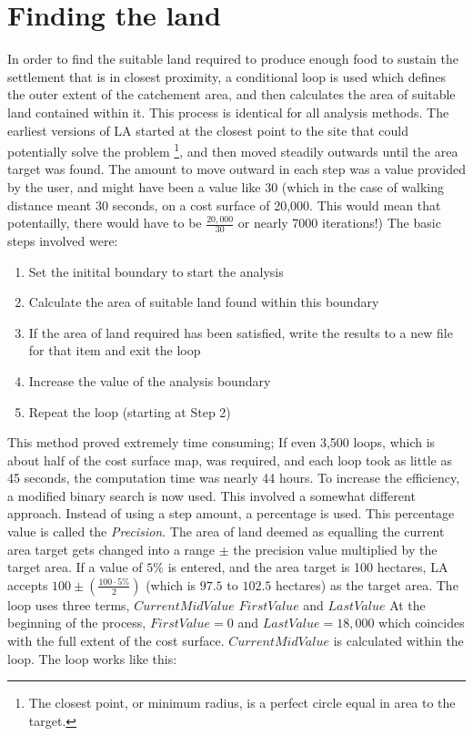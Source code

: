 \section{Finding the land} 

In order to find the suitable land required
to produce enough food to sustain the settlement that is in closest proximity, 
a conditional loop is used which defines the outer extent of the catchement area, 
and then calculates the area of suitable land contained within it.  This process is identical for all
analysis methods.  The earliest versions of LA started at the
closest point to the site that could potentially solve the problem
\footnote{The closest point, or minimum radius, is a perfect circle equal in
area to the target.}, and then moved steadily outwards until the area target
was found.  The amount to move outward in each step was a value provided by the
user, and might have been a value like 30 (which in the case of walking
distance meant 30 seconds, on  a cost surface of 20,000.  This would mean that
potentailly, there would have to be $\frac{20,000}{30}$ or nearly 7000 iterations!)
The basic steps involved were:

   \begin{enumerate} 
   
   \item  Set the initital boundary to start the analysis
   
   \item  Calculate the area of suitable land found within this boundary 
   
   \item If the area of land required has been satisfied, write the results to a new
   file for that item and exit the loop 
   
   \item  Increase the value of the analysis boundary 
   
   \item  Repeat the loop (starting at Step 2)
   
   \end{enumerate}

This method proved extremely time consuming;  If even 3,500 loops, which is
about half of the cost surface map, was required, and each loop took as little
as 45 seconds, the computation time was nearly 44 hours.   To increase the
efficiency, a modified binary search is now used.  This involved a somewhat
different approach.  Instead of using a step amount, a percentage is used.
This percentage value is called the \textit{Precision}. 
The area of land deemed as equalling the current area target gets changed into
a range $\pm$ the precision value multiplied by the target area. 
If a value of $5\%$ is entered, and the area
target is 100 hectares, LA accepts $100 \pm(\frac{100 \cdot
5\%}{2})$ (which is $97.5$ to $102.5$ hectares) as the target area.  The loop
uses three terms, $CurrentMidValue$ $FirstValue$ and $LastValue$ At the
beginning of the process, $FirstValue=0$ and $LastValue=18,000$ which coincides
with the full extent of the cost surface.  $CurrentMidValue$ is calculated
within the loop.  The loop works like this:

